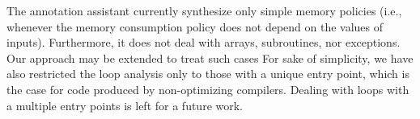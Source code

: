 
The annotation assistant currently synthesize only simple
memory policies (i.e., whenever the memory consumption policy does not depend on
the values of inputs).
Furthermore, it does not deal with arrays, subroutines, nor exceptions. Our approach may be extended to treat such cases 
 For sake of simplicity, we have also restricted the loop analysis only to those with a unique
entry point, which is the case for code produced by non-optimizing
compilers.
Dealing with loops with a multiple entry points is left for a future work. %

